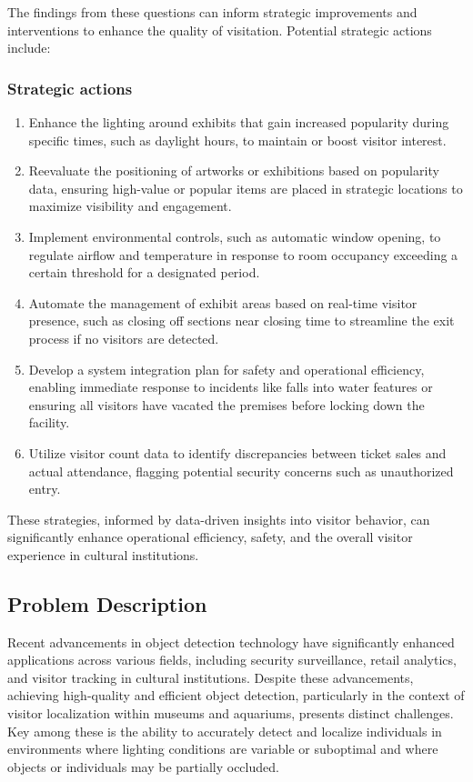The findings from these questions can inform strategic improvements and interventions to enhance the quality of visitation. Potential strategic actions include:
\subsubsection*{Strategic actions} 
\begin{enumerate}
    \item Enhance the lighting around exhibits that gain increased popularity during specific times, such as daylight hours, to maintain or boost visitor interest.
    \item Reevaluate the positioning of artworks or exhibitions based on popularity data, ensuring high-value or popular items are placed in strategic locations to maximize visibility and engagement.
    \item Implement environmental controls, such as automatic window opening, to regulate airflow and temperature in response to room occupancy exceeding a certain threshold for a designated period.
    \item Automate the management of exhibit areas based on real-time visitor presence, such as closing off sections near closing time to streamline the exit process if no visitors are detected.
    \item Develop a system integration plan for safety and operational efficiency, enabling immediate response to incidents like falls into water features or ensuring all visitors have vacated the premises before locking down the facility.
    \item Utilize visitor count data to identify discrepancies between ticket sales and actual attendance, flagging potential security concerns such as unauthorized entry.
\end{enumerate} 

These strategies, informed by data-driven insights into visitor behavior, can significantly enhance operational efficiency, safety, and the overall visitor experience in cultural institutions.

\subsection{Problem Description} 
Recent advancements in object detection technology have significantly enhanced applications across various fields, including security surveillance, retail analytics, and visitor tracking in cultural institutions. Despite these advancements, achieving high-quality and efficient object detection, particularly in the context of visitor localization within museums and aquariums, presents distinct challenges. Key among these is the ability to accurately detect and localize individuals in environments where lighting conditions are variable or suboptimal and where objects or individuals may be partially occluded.

